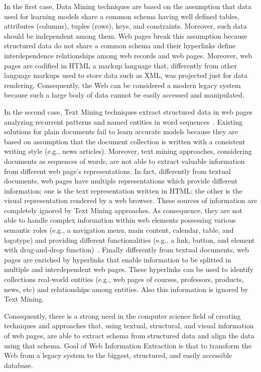 In the first case, Data Mining techniques are based on the assumption that data used for learning models share a common schema having well defined tables, attributes (columns), tuples (rows), keys, and constraints. Moreover, such data should be independent among them. 
Web pages break this assumption because structured data do not share a common schema and their hyperlinks define interdependence relationships among web records and web pages. Moreover, web pages are codified in HTML a markup language that, differently from other language markups used to store data such as XML, was projected just for data rendering. Consequently, the Web can be considered a modern legacy system because such a large body of data cannot be easily accessed and manipulated. 

In the second case, Text Mining techniques extract structured data in web pages analyzing recurrent patterns and named entities in word sequences~\cite{Sarawagi:2008}. Existing solutions for plain documents fail to learn accurate models because they are based on assumption that the document collection is written with a consistent writing style (e.g., news articles). Moreover, text mining approaches, considering documents as sequences of words, are not able to extract valuable information from different web page's representations. In fact, differently from textual documents, web pages have multiple representations which provide different information; one is the text representation written in HTML; the other is the visual representation rendered by a web browser. These sources of information are completely ignored by Text Mining approaches. As consequence, they are not able to handle complex information within web elements possessing various semantic roles (e.g., a navigation menu, main content, calendar, table, and logotype) and providing different functionalities (e.g., a link, button, and element with drag-and-drop function)~\cite{Qi:2009}. Finally differently from textual documents, web pages are enriched by hyperlinks that enable information to be splitted in multiple and interdependent web pages. These hyperlinks can be used to identify collections real-world entities (e.g., web pages of courses, professors, products, news, etc) and relationships among entities. Also this information is ignored by Text Mining. 

Consequently, there is a strong need in the computer science field of creating techniques and approaches that, using textual, structural, and visual information of web pages, are able to extract schema from structured data and align the data using that schema. 
Goal of Web Information Extraction is that to transform the Web from a legacy system to the biggest, structured, and easily accessible database. 

